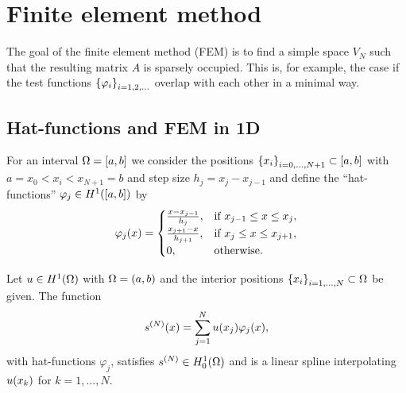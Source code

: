 \section{Finite element method}

The goal of the finite element method (FEM) is to find a simple space \(V_N\) such that the resulting matrix \(A\) is sparsely occupied.
This is, for example, the case if the test functions \(\braces*{\varphi_i}_{i = 1, 2, \ldots}\) overlap with each other in a minimal way.


\subsection{Hat-functions and FEM in 1D}

For an interval \(\Omega = \brackets*{a, b}\) we consider the positions \(\braces*{x_i}_{i = 0, \ldots, N + 1} \subset \brackets*{a, b}\) with \(a = x_0 < x_i < x_{N + 1} = b\) and step size \(h_j = x_j - x_{j - 1}\) and define the ``hat-functions'' \(\varphi_j \in H^1\parentheses*{\brackets*{a, b}}\) by
\[
    \varphi_j\parentheses*{x} = \begin{cases}
        \frac{x - x_{j - 1}}{h_j}, & \text{if }x_{j - 1} \le x \le x_j,\\
        \frac{x_{j + 1} - x}{h_{j + 1}}, & \text{if }x_j \le x \le x_{j + 1},\\
        0, & \text{otherwise}.
    \end{cases}
\]

\begin{theorem}
    Let \(u \in H^1\parentheses*{\Omega}\) with \(\Omega = \parentheses*{a, b}\) and the interior positions \(\braces*{x_i}_{i = 1, \ldots, N} \subset \Omega\) be given.
    The function
    \[
        s^{\parentheses*{N}}\parentheses*{x} = \sum_{j = 1}^N u\parentheses*{x_j}\varphi_j\parentheses*{x},
    \]
    with hat-functions \(\varphi_j\), satisfies \(s^{\parentheses*{N}} \in H_0^1\parentheses*{\Omega}\) and is a linear spline interpolating \(u\parentheses*{x_k}\) for \(k = 1, \ldots, N\).
\end{theorem}

